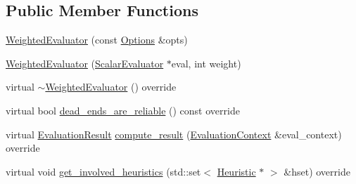 \subsection*{Public Member Functions}
\begin{DoxyCompactItemize}
\item 
\hyperlink{classWeightedEvaluator_a381f106feb5439fe04112ea07c46bf9c}{Weighted\-Evaluator} (const \hyperlink{classOptions}{Options} \&opts)
\item 
\hyperlink{classWeightedEvaluator_a921bba8ea745ddf9622ab1f100e48a33}{Weighted\-Evaluator} (\hyperlink{classScalarEvaluator}{Scalar\-Evaluator} $\ast$eval, int weight)
\item 
virtual \hyperlink{classWeightedEvaluator_a90da49b41c77c19683671bf836d5f002}{$\sim$\-Weighted\-Evaluator} () override
\item 
virtual bool \hyperlink{classWeightedEvaluator_ab2445a78cf700b55479941c186e432a2}{dead\-\_\-ends\-\_\-are\-\_\-reliable} () const override
\item 
virtual \hyperlink{classEvaluationResult}{Evaluation\-Result} \hyperlink{classWeightedEvaluator_a5885d8f741de0cd655610f939da724d8}{compute\-\_\-result} (\hyperlink{classEvaluationContext}{Evaluation\-Context} \&eval\-\_\-context) override
\item 
virtual void \hyperlink{classWeightedEvaluator_a16979bda79ed15f11ae9d59f3fd47c78}{get\-\_\-involved\-\_\-heuristics} (std\-::set$<$ \hyperlink{classHeuristic}{Heuristic} $\ast$ $>$ \&hset) override
\end{DoxyCompactItemize}


